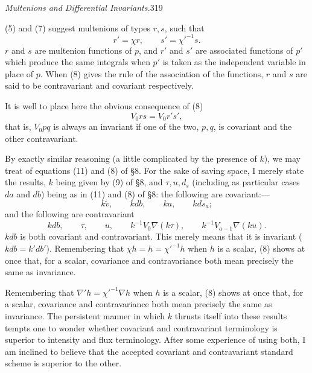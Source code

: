 \documentclass[11pt]{article}
\begin{document}
\newpage\thispagestyle{empty}\begin{center}\textit{Multenions and Differential Invariants.}\hfill 319\end{center}
(5) and (7) suggest multenions of types $r,s$, such that
\begin{equation}r'=\chi r,\qquad s'=\chi'^{-1}s.\tag{8}\end{equation}
$r$ and $s$ are multenion functions of $p$, and $r'$ and $s'$ are associated functions of $p'$ which produce the same integrals when $p'$ is taken as the independent variable in place of $p$. When (8) gives the rule of the association of the functions, $r$ and $s$ are said to be contravariant and covariant respectively.

\indent It is well to place here the obvious consequence of (8)
\begin{equation}V_0rs=V_0r's',\tag{9}\end{equation}
that is, $V_0pq$ is always an invariant if one of the two, $p,q$, is covariant and the other contravariant.

\indent By exactly similar reasoning (a little complicated by the presence of $k$), we may treat of equations (11) and (8) of §8. For the sake of saving space, I merely state the results, $k$ being given by (9) of §8, and $\tau,u,d_s$ (including as particular cases $da$ and $db$) being as in (11) and (8) of §8: the following are covariant:---
\[k\breve v,\qquad kdb,\qquad ka,\qquad kds_a;\]
and the following are contravariant
\[kdb,\qquad \tau,\qquad u,\qquad k^{-1}V_0\nabla(k\tau),\qquad k^{-1}V_{a-1}\nabla(ku).\]
$kdb$ is both covariant and contravariant. This merely means that it is invariant ($kdb=k'db'$). Remembering that $\chi h=h=\chi'^{-1}h$ when $h$ is a scalar, (8) shows at once that, for a scalar, covariance and contravariance both mean precisely the same as invariance.

\indent Remembering that $\nabla'h=\chi'^{-1}\nabla h$ when $h$ is a scalar, (8) shows at once that, for a scalar, covariance and contravariance both mean precisely the same as invariance. The persistent manner in which $k$ thrusts itself into these results tempts one to wonder whether covariant and contravariant terminology is superior to intensity and flux terminology. After some experience of using both, I am inclined to believe that the accepted covariant and contravariant standard scheme is superior to the other.
\end{document}
